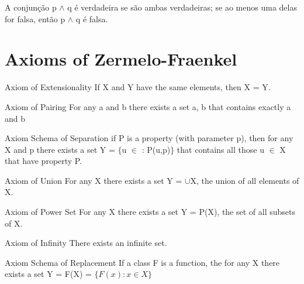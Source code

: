 \documentclass[10pt,a4paper]{article}
\begin{document}
\begin{df}
A conjunção p $\wedge$ q é verdadeira se são ambas verdadeiras; se ao menos uma delas for falsa, então p $\wedge$ q é falsa.
\end{df}



\section{Axioms  of Zermelo-Fraenkel}
\begin{axiom}{Axiom of Extensionality}
	If X and Y have the same elements, then X = Y.
\end{axiom}

\begin{axiom}{Axiom of Pairing}
	For any a and b there exists a set {a, b} that contains exactly a and b
\end{axiom}

\begin{axiom}{Axiom Schema of Separation}
	if P is a property (with parameter p), then for any X and p there exists a set Y = $\lbrace$u $\in$ : P(u,p)$\rbrace$ that contains all those u $\in$ X that have property P.
\end{axiom}

\begin{axiom}{Axiom of Union}
	For any X there exists a set Y = $\cup$X, the union of all elements of X.
\end{axiom}

\begin{axiom}{Axiom of Power Set}
	For any X there exists a set Y = P(X), the set of all subsets of X.
\end{axiom}

\begin{axiom}{Axiom of Infinity}
	There exists an infinite set.
\end{axiom}

\begin{axiom}{Axiom Schema of Replacement}
	If a class F is a function, the for any X there exists a set Y = F(X) = $\lbrace F(x) : x \in X \rbrace$
\end{axiom}
\end{document}

